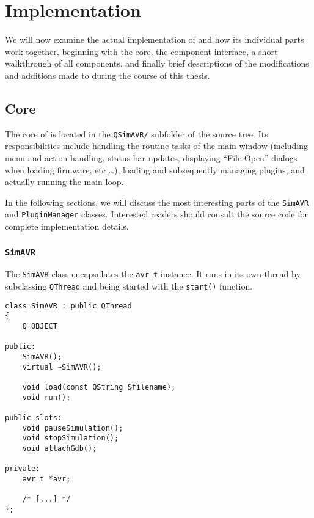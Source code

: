 
\chapter{Implementation} \label{chapter:implementation}

We will now examine the actual implementation of \qsimavr and how its individual
parts work together, beginning with the core, the component interface,
a short walkthrough of all components, and finally brief descriptions of the
modifications and additions made to \simavr during the course of this thesis.


\section{\qsimavr Core} \label{section:core}

The core of \qsimavr is located in the \verb|QSimAVR/| subfolder of the source
tree. Its responsibilities include handling the routine tasks of the main window
(including menu and action handling, status bar updates, displaying ``File Open''
dialogs when loading firmware, etc \ldots), loading and subsequently managing
plugins, and actually running the \simavr main loop.

In the following sections, we will discuss the most interesting parts of the
\lstinline|SimAVR| and \lstinline|PluginManager| classes. Interested readers
should consult the source code for complete implementation details.


\subsection{\lstinline|SimAVR|} \label{subsection:class_simavr}

The \lstinline|SimAVR| class encapsulates the \lstinline|avr_t| instance. It
runs in its own thread by subclassing \lstinline|QThread| and being started
with the \lstinline|start()| function.

\begin{lstlisting}
class SimAVR : public QThread
{
    Q_OBJECT

public:
    SimAVR();
    virtual ~SimAVR();

    void load(const QString &filename);
    void run();

public slots:
    void pauseSimulation();
    void stopSimulation();
    void attachGdb();

private:
    avr_t *avr;

    /* [...] */
};
\end{lstlisting}

